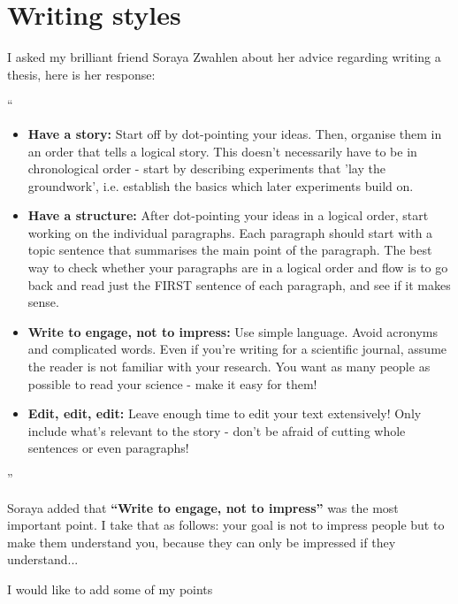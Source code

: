 \chapter{Writing styles}

I asked my brilliant friend Soraya Zwahlen about her advice regarding writing a thesis, here is her response:

``\begin{itemize}
    \item \textbf{Have a story:}
Start off by dot-pointing your ideas. Then, organise them in an order that tells a logical story. This doesn't necessarily have to be in chronological order - start by describing experiments that 'lay the groundwork', i.e. establish the basics which later experiments build on.
    \item \textbf{Have a structure:}
After dot-pointing your ideas in a logical order, start working on the individual paragraphs. Each paragraph should start with a topic sentence that summarises the main point of the paragraph. The best way to check whether your paragraphs are in a logical order and flow is to go back and read just the FIRST sentence of each paragraph, and see if it makes sense.
    \item \textbf{Write to engage, not to impress:}
Use simple language. Avoid acronyms and complicated words. Even if you're writing for a scientific journal, assume the reader is not familiar with your research. You want as many people as possible to read your science - make it easy for them!
    \item \textbf{Edit, edit, edit:}
Leave enough time to edit your text extensively! Only include what's relevant to the story - don't be afraid of cutting whole sentences or even paragraphs! 
\end{itemize}''

Soraya added that \textbf{``Write to engage, not to impress''} was the most important point. I take that as follows: your goal is not to impress people but to make them understand you, because they can only be impressed if they understand...

I would like to add some of my points

